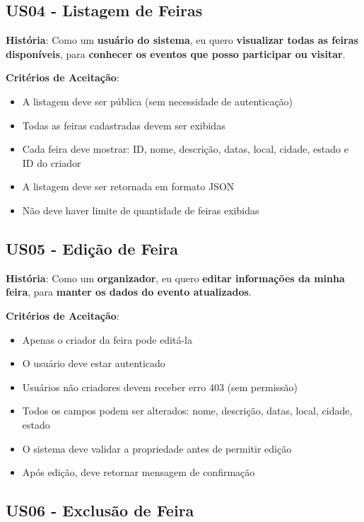 \documentclass[12pt,a4paper]{article}
\begin{document}
\subsection{US04 - Listagem de Feiras}

\textbf{História}: Como um \textbf{usuário do sistema}, eu quero \textbf{visualizar todas as feiras disponíveis}, para \textbf{conhecer os eventos que posso participar ou visitar}.

\textbf{Critérios de Aceitação}:
\begin{itemize}
    \item A listagem deve ser pública (sem necessidade de autenticação)
    \item Todas as feiras cadastradas devem ser exibidas
    \item Cada feira deve mostrar: ID, nome, descrição, datas, local, cidade, estado e ID do criador
    \item A listagem deve ser retornada em formato JSON
    \item Não deve haver limite de quantidade de feiras exibidas
\end{itemize}

\subsection{US05 - Edição de Feira}

\textbf{História}: Como um \textbf{organizador}, eu quero \textbf{editar informações da minha feira}, para \textbf{manter os dados do evento atualizados}.

\textbf{Critérios de Aceitação}:
\begin{itemize}
    \item Apenas o criador da feira pode editá-la
    \item O usuário deve estar autenticado
    \item Usuários não criadores devem receber erro 403 (sem permissão)
    \item Todos os campos podem ser alterados: nome, descrição, datas, local, cidade, estado
    \item O sistema deve validar a propriedade antes de permitir edição
    \item Após edição, deve retornar mensagem de confirmação
\end{itemize}

\subsection{US06 - Exclusão de Feira}
\end{document}
